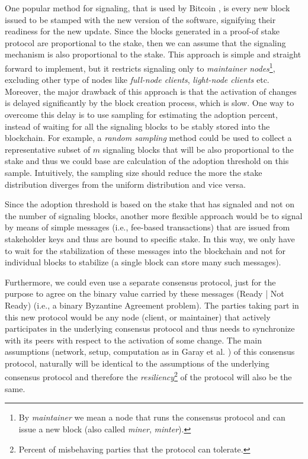 One popular method for signaling, that is used by Bitcoin \cite{bitcoin}, is every new block issued to be stamped with the new version of the software, signifying their readiness for the new update. Since the blocks generated in a proof-of stake protocol are proportional to the stake, then we can assume that the signaling mechanism is also proportional to the stake. This approach is simple and straight forward to implement, but it restricts signaling only to \emph{maintainer nodes}\footnote{By \emph{maintainer} we mean a node that runs the consensus protocol and can issue a new block (also called \emph{miner}, \emph{minter}).}, excluding other type of nodes like \emph{full-node clients}, \emph{light-node clients} etc. Moreover, the major drawback of this approach is that the activation of changes is delayed significantly by the block creation process, which is slow.
 One way to overcome this delay is to use sampling for estimating the adoption percent, instead of waiting for all the signaling blocks to be stably stored into the blockchain. For example, a \emph{random sampling} method could be used to collect a representative subset of $m$ signaling blocks that will be also proportional to the stake and thus we could base are calculation of the adoption threshold on this sample. Intuitively, the sampling size should reduce the more the stake distribution diverges from the uniform distribution and vice versa.

Since the adoption threshold is based on the stake that has signaled and not on the number of signaling blocks, another more flexible approach would be to signal by means of simple messages (i.e., fee-based transactions) that are issued from stakeholder keys and thus are bound to specific stake. In this way, we only have to wait for the stabilization of these messages into the blockchain and not for individual blocks to stabilize (a single block can store many such messages).

Furthermore, we could even use a separate consensus protocol, just for the purpose to agree on the binary value carried by these messages (Ready | Not Ready) (i.e., a binary Byzantine Agreement problem). The parties taking part in this new protocol would be any node (client, or maintainer) that actively participates in the underlying consensus protocol and thus needs to synchronize with its peers with respect to the activation of some change. The main assumptions (network, setup, computation as in Garay et al. \cite{sok}) of this consensus protocol, naturally will be identical to the assumptions of the underlying consensus protocol and therefore the \emph{resiliency}\footnote{Percent of misbehaving parties that the protocol can tolerate.} of the protocol will also be the same. 

